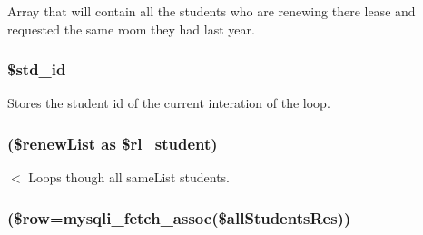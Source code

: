 \-Array that will contain all the students who are renewing there lease and requested the same room they had last year. \hypertarget{autoStudent_8php_aac8edac502b6ed1fc852e8735ae424c2}{
\subsubsection[{\$std\-\_\-id}]{\setlength{\rightskip}{0pt plus 5cm}\$std\-\_\-id}}\label{autoStudent_8php_aac8edac502b6ed1fc852e8735ae424c2}
\-Stores the student id of the current interation of the loop. \hypertarget{autoStudent_8php_ae984c01f36faa31c40889b54bab3cc5f}{
\subsubsection[{foreach}]{(\$renew\-List as \$rl\-\_\-student)}}\label{autoStudent_8php_ae984c01f36faa31c40889b54bab3cc5f}
$<$ \-Loops though all same\-List students. \hypertarget{autoStudent_8php_a3ad3a4240c0f97c7e85aff5c52a454d4}{
\subsubsection[{print}]{}}\label{autoStudent_8php_a3ad3a4240c0f97c7e85aff5c52a454d4}
\hypertarget{autoStudent_8php_a5814f5c1f5fabe3c16fc34e62a376cfb}{
\subsubsection[{while}]{(\$row=mysqli\-\_\-fetch\-\_\-assoc(\$all\-Students\-Res))}}\label{autoStudent_8php_a5814f5c1f5fabe3c16fc34e62a376cfb}
